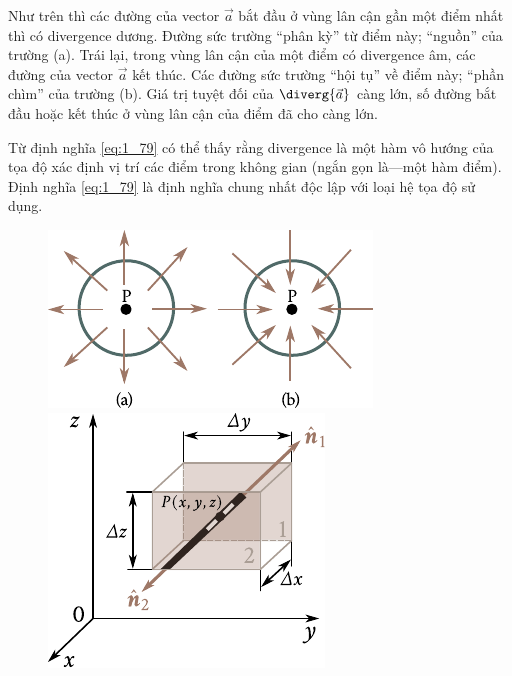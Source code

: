 Như trên thì các đường của vector $\vec{a}$ bắt đầu ở vùng lân cận gần một điểm nhất thì có divergence dương. Đường sức trường ``phân kỳ'' từ điểm này; ``nguồn'' của trường (a). Trái lại, trong vùng lân cận của một điểm có divergence âm, các đường của vector $\vec{a}$ kết thúc. Các đường sức trường ``hội tụ'' về điểm này; ``phần chìm'' của trường (b). Giá trị tuyệt đối của $\diverg{\vec{a}}$ càng lớn, số đường bắt đầu hoặc kết thúc ở vùng lân cận của điểm đã cho càng lớn.

Từ định nghĩa \eqref{eq:1_79} có thể thấy rằng divergence là một hàm vô hướng của tọa độ xác định vị trí các điểm trong không gian (ngắn gọn là---một hàm điểm). Định nghĩa \eqref{eq:1_79} là định nghĩa chung nhất độc lập với loại hệ tọa độ sử dụng.

\begin{figure}[!htb]
	\begin{minipage}[t]{0.5\linewidth}
		\begin{center}
			\includegraphics[scale=1.0]{figures/ch_01/fig_1_24.pdf}
			\caption[]{}
			\label{fig:1_24}
		\end{center}
	\end{minipage}
	\hspace{-0.05cm}
	\begin{minipage}[t]{0.5\linewidth}
		\begin{center}
			\includegraphics[scale=1.0]{figures/ch_01/fig_1_25.pdf}
			\caption[]{}
			\label{fig:1_25}
		\end{center}
	\end{minipage}
\vspace{-0.4cm}
\end{figure}

